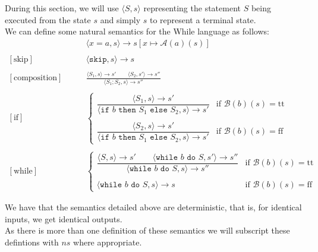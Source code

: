 \documentclass[a4paper, 12pt, twoside]{article}
\begin{document}
During this section, we will use $\langle S, s\rangle$
representing the statement $S$ being executed from the state $s$ and
simply $s$ to represent a terminal state.
\\[\baselineskip]
We can define some natural semantics for the While language as follows:
\begin{align*}
  [\text{assignment}]& \qquad \langle x=a, s \rangle \to s[x\mapsto \mathcal{A}(a)(s)] \\ \\
  [\text{skip}]& \qquad \langle \texttt{skip}, s \rangle \to s \\ \\
  [\text{composition}]& \qquad \frac{
    \langle S_1, s \rangle \to s' \qquad \langle S_2, s' \rangle \to s''
  }{\langle S_1;S_2, s \rangle \to s''} \\ \\
  [\text{if}]& \qquad \begin{cases}
    \dfrac{
      \langle S_1, s \rangle \to s'
    }{
      \langle \texttt{if } b \texttt{ then } S_1 \texttt{ else } S_2, s \rangle \to s'
    } & \text{if } \mathcal{B}(b)(s) = \text{tt} \\ \\
    \dfrac{
      \langle S_2, s \rangle \to s'
    }{
      \langle \texttt{if } b \texttt{ then } S_1 \texttt{ else } S_2, s \rangle \to s'
    } & \text{if } \mathcal{B}(b)(s) = \text{ff}
  \end{cases} \\ \\
  [\text{while}]& \qquad \begin{cases}
    \dfrac{
      \langle S, s \rangle \to s' \qquad \langle 
      \texttt{while } b \texttt{ do } S, s' \rangle \to s''
    }{
      \langle \texttt{while } b \texttt{ do } S, s \rangle \to s''
    } & \text{if } \mathcal{B}(b)(s) = \text{tt} \\ \\
    \langle \texttt{while } b \texttt{ do } S, s \rangle \to s
    & \text{if } \mathcal{B}(b)(s) = \text{ff}
  \end{cases}
\end{align*}

We have that the semantics detailed above are deterministic, that is,
for identical inputs, we get identical outputs.
\\[\baselineskip]
As there is more than one definition of these semantics
we will subscript these defintions with $ns$ where appropriate.

\newpage
\end{document}
